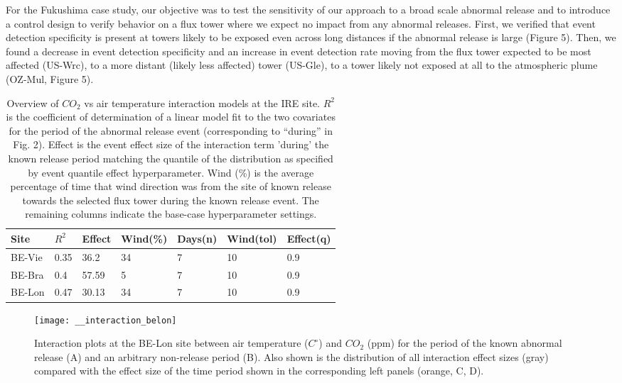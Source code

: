\documentclass{article}
\begin{document}
For the Fukushima case study, our objective was to test the sensitivity of our approach to a broad scale abnormal release and to introduce a control design to verify behavior on a flux tower where we expect no impact from any abnormal releases. First, we verified that event detection specificity is present at towers likely to be exposed even across long distances if the abnormal release is large (Figure 5). Then, we found a decrease in event detection specificity and an increase in event detection rate moving from the flux tower expected to be most affected (US-Wrc), to a more distant (likely less affected) tower (US-Gle), to a tower likely not exposed at all to the atmospheric plume (OZ-Mul, Figure 5).

\begin{table}[]
	\centering
	\caption{Overview of $CO_2$ vs air temperature interaction models at the IRE site. $R^2$ is the coefficient of determination of a linear model fit to the two covariates for the period of the abnormal release event (corresponding to “during” in Fig. 2). Effect is the event effect size of the interaction term 'during' the known release period matching the quantile of the distribution as specified by event quantile effect hyperparameter. Wind (\%) is the average percentage of time that wind direction was from the site of known release towards the selected flux tower during the known release event. The remaining columns indicate the base-case hyperparameter settings.}
	\begin{tabular}{@{}lllllll@{}}
	\toprule
	Site & $R^2$ & Effect & Wind(\%) & Days(n) & Wind(tol) & Effect(q) \\ \midrule
	BE-Vie & 0.35 & 36.2  & 34 & 7 & 10 & 0.9  \\
	BE-Bra & 0.4 & 57.59  & 5 & 7 & 10 & 0.9 \\
	BE-Lon & 0.47 & 30.13 & 34 & 7 & 10 & 0.9 \\ \bottomrule
	\end{tabular}	
	\label{table:1}
	\end{table}

\begin{figure}
	\centering
	\texttt{[image: \_\_interaction\_belon]}
	\caption{Interaction plots at the BE-Lon site between air temperature ($C^{\circ}$) and $CO_2$ (ppm) for the period of the known abnormal release (A) and an arbitrary non-release period (B). Also shown is the distribution of all interaction effect sizes (gray) compared with the effect size of the time period shown in the corresponding left panels (orange, C, D).}
	\label{fig:interaction}
\end{figure}
\end{document}
